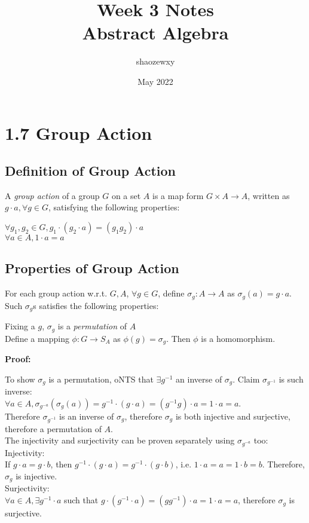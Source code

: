 \documentclass{article}
\title{Week 3 Notes\\
\large{Abstract Algebra}}
\author{shaozewxy }
\date{May 2022}
\begin{document}
\maketitle
\setcounter{secnumdepth}{0}
\section{1.7 Group Action}
\subsection{Definition of Group Action}
A \textit{group action} of a group $G$ on a set $A$ is a map form $G\times A \rightarrow A$, written as $g\cdot a,\forall g \in G$, satisfying the following properties:
\begin{addmargin}[1em]{0em}
$\forall g_1, g_2 \in G, g_1 \cdot (g_2 \cdot a) = (g_1g_2) \cdot a$\\
$\forall a \in A, 1\cdot a = a$
\end{addmargin}
\subsection{Properties of Group Action}
For each group action w.r.t. $G, A$, $\forall g \in G$, define $\sigma_g: A \rightarrow A$ as $\sigma_g(a) = g\cdot a$.\\
Such $\sigma_g$s satisfies the following properties:
\begin{addmargin}[1em]{0em}
Fixing a $g$, $\sigma_g$ is a \textit{permutation} of $A$\\
Define a mapping $\phi:G \rightarrow S_A$ as $\phi(g) = \sigma_g$. Then $\phi$ is a homomorphism.
\end{addmargin}
\textbf{Proof:}
\begin{addmargin}[1em]{0em}
To show $\sigma_g$ is a permutation, oNTS that $\exists g^{-1}$ an inverse of $\sigma_g$. Claim $\sigma_{g^{-1}}$ is such inverse:\\
$\forall a \in A, \sigma_{g^{-a}}(\sigma_g (a)) = g^{-1}\cdot (g \cdot a) = (g^{-1}g) \cdot a = 1\cdot a = a$.\\
Therefore $\sigma_{g^{-1}}$ is an inverse of $\sigma_g$, therefore $\sigma_g$ is both injective and surjective, therefore a permutation of $A$.\\
The injectivity and surjectivity can be proven separately using $\sigma_{g^{-a}}$ too:\\
Injectivity:\\
If $g\cdot a = g\cdot b$, then $g^{-1}\cdot (g\cdot a) = g^{-1}\cdot (g\cdot b)$, i.e. $1\cdot a = a = 1\cdot b = b$. Therefore, $\sigma_g$ is injective.\\
Surjectivity:\\
$\forall a \in A, \exists g^{-1}\cdot a$ such that $g\cdot (g^{-1}\cdot a) = (gg^{-1})\cdot a = 1\cdot a = a$, therefore $\sigma_g$ is surjective.
\end{addmargin}
\end{document}
